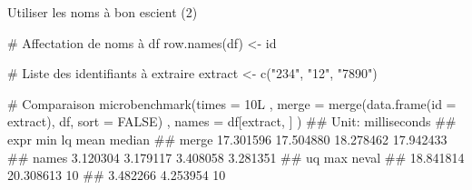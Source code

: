 \documentclass[12pt,ignorenonframetext,handout,]{beamer}
\newenvironment{Shaded}{}{}
\newcommand{\CommentTok}[1]{\textcolor[rgb]{0.00,0.50,0.00}{#1}}
\newcommand{\DataTypeTok}[1]{#1}
\newcommand{\KeywordTok}[1]{\textcolor[rgb]{0.00,0.00,1.00}{#1}}
\newcommand{\NormalTok}[1]{#1}
\newcommand{\OtherTok}[1]{\textcolor[rgb]{1.00,0.25,0.00}{#1}}
\newcommand{\StringTok}[1]{\textcolor[rgb]{0.00,0.50,0.50}{#1}}
\renewenvironment{Shaded}{\begin{snugshade}}{\end{snugshade}}
\begin{document}
\begin{frame}[fragile]{Utiliser les noms à bon escient (2)}
\protect\hypertarget{utiliser-les-noms-a-bon-escient-2}{}

\footnotesize

\begin{Shaded}
\begin{Highlighting}[]
\CommentTok{# Affectation de noms à df }
\KeywordTok{row.names}\NormalTok{(df) <-}\StringTok{ }\NormalTok{id}

\CommentTok{# Liste des identifiants à extraire}
\NormalTok{extract <-}\StringTok{ }\KeywordTok{c}\NormalTok{(}\StringTok{"234"}\NormalTok{, }\StringTok{"12"}\NormalTok{, }\StringTok{"7890"}\NormalTok{)}

\CommentTok{# Comparaison}
\KeywordTok{microbenchmark}\NormalTok{(}\DataTypeTok{times =}\NormalTok{ 10L}
\NormalTok{  , }\DataTypeTok{merge =} \KeywordTok{merge}\NormalTok{(}\KeywordTok{data.frame}\NormalTok{(}\DataTypeTok{id =}\NormalTok{ extract), df, }\DataTypeTok{sort =} \OtherTok{FALSE}\NormalTok{)}
\NormalTok{  , }\DataTypeTok{names =}\NormalTok{ df[extract, ]}
\NormalTok{)}
\NormalTok{  ## Unit: milliseconds}
\NormalTok{  ##   expr       min        lq      mean    median}
\NormalTok{  ##  merge 17.301596 17.504880 18.278462 17.942433}
\NormalTok{  ##  names  3.120304  3.179117  3.408058  3.281351}
\NormalTok{  ##         uq       max neval}
\NormalTok{  ##  18.841814 20.308613    10}
\NormalTok{  ##   3.482266  4.253954    10}
\end{Highlighting}
\end{Shaded}

\end{frame}
\end{document}
